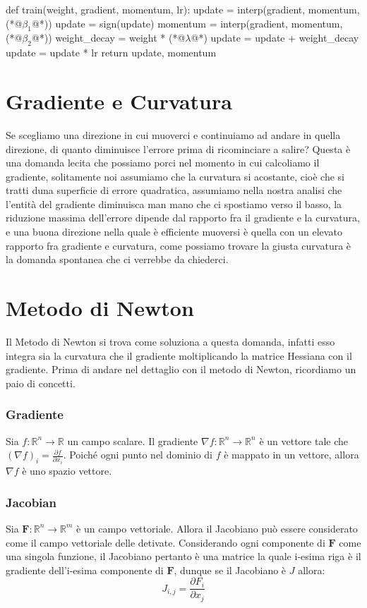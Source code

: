 \begin{python}[frame=trBL]
    def train(weight, gradient, momentum, lr):
        update = interp(gradient, momentum, (*@$\beta_1$@*))
        update = sign(update)
        momentum = interp(gradient, momentum, (*@$\beta_2$@*))
        weight_decay = weight * (*@$\lambda$@*)
        update = update + weight_decay
        update = update * lr
    return update, momentum
\end{python}

\section{Gradiente e Curvatura}
Se scegliamo una direzione in cui muoverci e continuiamo ad andare in quella direzione, di quanto diminuisce l'errore prima di ricominciare a salire? Questa è una domanda lecita che possiamo porci nel momento in cui calcoliamo il gradiente, solitamente noi assumiamo che la curvatura si acostante, cioè che si tratti duna superficie di errore quadratica, assumiamo nella nostra analisi che l'entità del gradiente diminuisca man mano che ci spostiamo verso il basso, la riduzione massima dell'errore dipende dal rapporto fra il gradiente e la curvatura, e una buona direzione nella quale è efficiente muoversi è quella con un elevato rapporto fra gradiente e curvatura, come possiamo trovare la giusta curvatura è la domanda spontanea che ci verrebbe da chiederci.

\section{Metodo di Newton}
Il Metodo di Newton si trova come soluziona a questa domanda, infatti esso integra sia la curvatura che il gradiente moltiplicando la matrice Hessiana con il gradiente. Prima di andare nel dettaglio con il metodo di Newton, ricordiamo un paio di concetti.

\subsubsection{Gradiente}
Sia $f:\mathbb{R}^n \rightarrow \mathbb{R}$ un campo scalare. Il gradiente $\nabla f:\mathbb{R}^n \rightarrow \mathbb{R}^n$ è un vettore tale che $(\nabla f)_i = \frac{\partial f}{\partial x_i}$. Poiché ogni punto nel dominio di $f$ è mappato in un vettore, allora $\nabla f$ è uno spazio vettore.

\subsubsection{Jacobian}
Sia $\mathbf{F}:\mathbb{R}^n \rightarrow \mathbb{R}^m$ è un campo vettoriale. Allora il Jacobiano può essere considerato come il campo vettoriale delle detivate. Considerando ogni componente di $\mathbf{F}$ come una singola funzione, il Jacobiano pertanto è una matrice la quale i-esima riga è il gradiente dell'i-esima componente di $\mathbf{F}$, dunque se il Jacobiano è $J$ allora:
\begin{equation}
    J_{i,j} = \frac{\partial F_i}{\partial x_j}
\end{equation}

